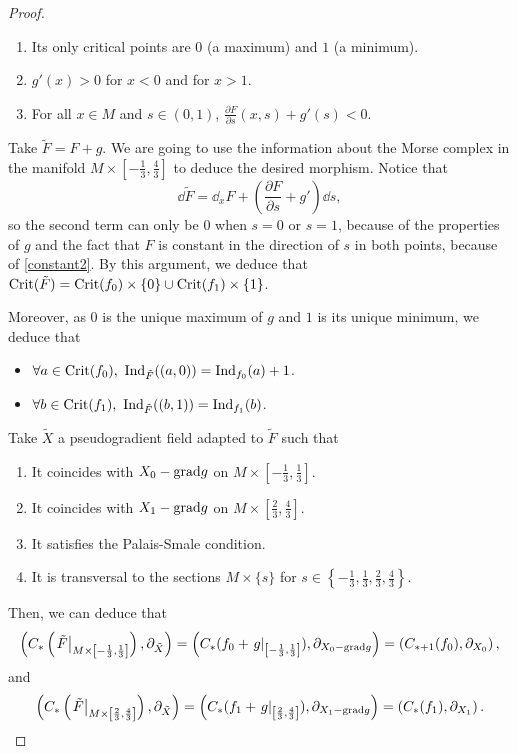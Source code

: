 \begin{proof}
\begin{enumerate}
	\item Its only critical points are $0$ (a maximum) and $1$ (a minimum).
	\item $g'(x) > 0$ for $x < 0$ and for $x > 1$.
	\item For all $x \in M$ and $s \in (0,1)$, $\frac{\partial F}{\partial s}(x,s) + g'(s) < 0$.
\end{enumerate}

Take $\tilde{F} = F + g$. We are going to use the information about the Morse complex in the manifold $M \times \left[-\frac13,\frac43\right]$ to deduce the desired morphism. Notice that
\begin{displaymath}
\dd\tilde{F} = \dd_xF + \left( \frac{\partial F}{\partial s} + g' \right) \dd s ,
\end{displaymath}
so the second term can only be $0$ when $s=0$ or $s=1$, because of the properties of $g$ and the fact that $F$ is constant in the direction of $s$ in both points, because of \ref{constant2}. By this argument, we deduce that $\text{Crit}(\tilde{F}) = \text{Crit}(f_0) \times \{0\} \cup \text{Crit}(f_1) \times \{1\}$.

Moreover, as $0$ is the unique maximum of $g$ and $1$ is its unique minimum, we deduce that

\begin{itemize}
	\item $\forall a \in \crit(f_0), \ \indx_{\tilde{F}}((a,0)) = \indx_{f_0}(a) + 1$.
	\item $\forall b \in \crit(f_1), \ \indx_{\tilde{F}}((b,1)) = \indx_{f_1}(b)$.
\end{itemize}

Take $\tilde{X}$ a pseudogradient field adapted to $\tilde{F}$ such that

\begin{enumerate}
	\item It coincides with $X_0 - \text{grad} g$ on $M \times \left[-\frac13,\frac13\right]$.
	\item It coincides with $X_1 - \text{grad} g$ on $M \times \left[\frac23,\frac43\right]$.
	\item It satisfies the Palais-Smale condition.
	\item It is transversal to the sections $M \times \{s\}$ for $s \in \left\{-\frac13,\frac13,\frac23,\frac43\right\}$.
\end{enumerate}

Then, we can deduce that
\begin{displaymath}
\left(C_{\ast}\left(\left.\tilde{F}\right|_{M\times \left[-\frac13,\frac13\right]}\right), \partial_{\tilde{X}}\right) =
\left(C_{\ast}(f_0+\left.g\right|_{\left[-\frac13,\frac13\right]}), \partial_{X_0 - \text{grad} g}\right) =
\left(C_{\ast + 1}(f_0), \partial_{X_0}\right) ,
\end{displaymath}
and
\begin{displaymath}
\left(C_{\ast}\left(\left.\tilde{F}\right|_{M\times \left[\frac23,\frac43\right]}\right), \partial_{\tilde{X}}\right) =
\left(C_{\ast}(f_1+\left.g\right|_{\left[\frac23,\frac43\right]}), \partial_{X_1 - \text{grad} g}\right) =
\left(C_{\ast}(f_1), \partial_{X_1}\right) .
\end{displaymath}


\end{proof}
